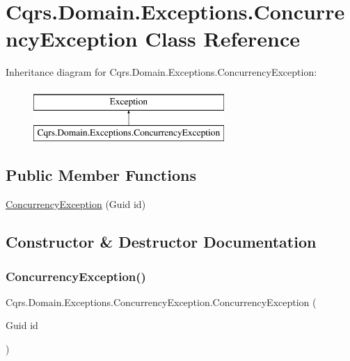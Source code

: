 \hypertarget{classCqrs_1_1Domain_1_1Exceptions_1_1ConcurrencyException}{}\section{Cqrs.\+Domain.\+Exceptions.\+Concurrency\+Exception Class Reference}
\label{classCqrs_1_1Domain_1_1Exceptions_1_1ConcurrencyException}
Inheritance diagram for Cqrs.\+Domain.\+Exceptions.\+Concurrency\+Exception\+:\begin{figure}[H]
\begin{center}
\leavevmode
\includegraphics[height=2.000000cm]{classCqrs_1_1Domain_1_1Exceptions_1_1ConcurrencyException}
\end{center}
\end{figure}
\subsection*{Public Member Functions}
\begin{DoxyCompactItemize}
\item 
\hyperlink{classCqrs_1_1Domain_1_1Exceptions_1_1ConcurrencyException_aed52d2484adb911db51fd50f18f3e477}{Concurrency\+Exception} (Guid id)
\end{DoxyCompactItemize}


\subsection{Constructor \& Destructor Documentation}
\mbox{\label{classCqrs_1_1Domain_1_1Exceptions_1_1ConcurrencyException_aed52d2484adb911db51fd50f18f3e477}} 
\subsubsection{\texorpdfstring{Concurrency\+Exception()}{ConcurrencyException()}}
{\footnotesize\ttfamily Cqrs.\+Domain.\+Exceptions.\+Concurrency\+Exception.\+Concurrency\+Exception (\begin{DoxyParamCaption}\item[{Guid}]{id }\end{DoxyParamCaption})}

